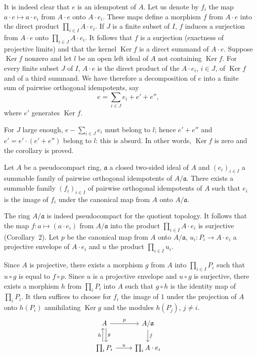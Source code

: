 It is indeed clear that $e$ is an idempotent of $A$. Let us denote by
$f_i$ the map $a\cdot e\mapsto a\cdot e_i$ from $A\cdot e$ onto
$A\cdot e_i$. These maps define a morphism $f$ from $A\cdot e$ into
the direct product $\prod_{i\in I}A\cdot e_i$. If $J$ is a finite
subset of $I$, $f$ induces a surjection from $A\cdot e$ onto
$\prod_{i\in J}A\cdot e_i$. It follows that $f$ is a surjection
(exactness of projective limits) and that the kernel
$\operatorname{Ker}f$ is a direct summand of $A\cdot e$. Suppose
$\operatorname{Ker}f$ nonzero and let $l$ be an open left ideal of $A$
not containing $\operatorname{Ker}f$. For every finite subset $J$ of
$I$, $A\cdot e$ is the direct product of the $A\cdot e_i$, $i\in J$,
of $\operatorname{Ker}f$ and of a third summand. We have therefore a
decomposition of $e$ into a finite sum of pairwise orthogonal
idempotents, say
\[
e=\sum_{i\in J}e_i+e'+e'',
\]
where $e'$ generates $\operatorname{Ker}f$.

For $J$ large enough, $e-\sum_{i\in J}e_i$ must belong to $l$; hence
$e'+e''$ and $e'=e'\cdot(e'+e'')$ belong to $l$: this is absurd. In
other words, $\operatorname{Ker}f$ is zero and the corollary is proved.

\begin{corollary}
Let $A$ be a pseudocompact ring, $\mathfrak{a}$ a closed two-sided
ideal of $A$ and $(e_i)_{i\in I}$ a summable family of pairwise
orthogonal idempotents of $A/\mathfrak{a}$. There exists a summable
family $(f_i)_{i\in I}$ of pairwise orthogonal idempotents of $A$ such
that $e_i$ is the image of $f_i$ under the canonical map from $A$ onto
$A/\mathfrak{a}$.
\end{corollary}

The ring $A/\mathfrak{a}$ is indeed pseudocompact for the quotient
topology. It follows that the map $f\colon a\mapsto(a\cdot e_i)$ from
$A/\mathfrak{a}$ into the product $\prod_{i\in I}A\cdot e_i$ is
surjective (Corollary~2). Let $p$ be the canonical map from $A$ onto
$A/\mathfrak{a}$, $u_i\colon P_i\to A\cdot e_i$ a projective envelope
of $A\cdot e_i$ and $u$ the product $\prod_{i\in I}u_i$.

Since $A$ is projective, there exists a morphism $g$ from $A$ into
$\prod_{i\in I}P_i$ such that $u\circ g$ is equal to $f\circ p$. Since
$u$ is a projective envelope and $u\circ g$ is surjective, there exists
a morphism $h$ from $\prod_i P_i$ into $A$ such that $g\circ h$
is the identity map of $\prod_i P_i$. It then suffices to choose for $f_i$
the image of $1$ under the projection of $A$ onto $h(P_i)$ annihilating
$\operatorname{Ker}g$ and the modules $h(P_j)$, $j\ne i$.
\[
\begin{tikzcd}
A \arrow[r, "p"] \arrow[d, shift left, "g"] & A/\mathfrak{a} \arrow[d, "f"] \\
\prod_i P_i \arrow[r, "u"] \arrow[u, shift left, "h"] & \prod_i A\cdot e_i
\end{tikzcd}
\]

